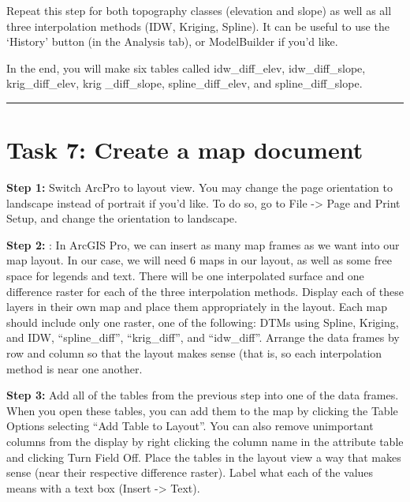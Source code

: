 \documentclass[
]{book}
\begin{document}
Repeat this step for both topography classes (elevation and slope) as well as all three interpolation methods (IDW, Kriging, Spline). It can be useful to use the `History' button (in the Analysis tab), or ModelBuilder if you'd like.

In the end, you will make six tables called idw\_diff\_elev, idw\_diff\_slope, krig\_diff\_elev, krig \_diff\_slope, spline\_diff\_elev, and spline\_diff\_slope.

\begin{center}\rule{0.5\linewidth}{0.5pt}\end{center}

\hypertarget{task-7-create-a-map-document}{%
\section*{Task 7: Create a map document}\label{task-7-create-a-map-document}}

\textbf{Step 1:} Switch ArcPro to layout view. You may change the page orientation to landscape instead of portrait if you'd like. To do so, go to File -\textgreater{} Page and Print Setup, and change the orientation to landscape.

\textbf{Step 2:} : In ArcGIS Pro, we can insert as many map frames as we want into our map layout. In our case, we will need 6 maps in our layout, as well as some free space for legends and text. There will be one interpolated surface and one difference raster for each of the three interpolation methods. Display each of these layers in their own map and place them appropriately in the layout. Each map should include only one raster, one of the following: DTMs using Spline, Kriging, and IDW, ``spline\_diff'', ``krig\_diff'', and ``idw\_diff''. Arrange the data frames by row and column so that the layout makes sense (that is, so each interpolation method is near one another.

\textbf{Step 3:} Add all of the tables from the previous step into one of the data frames. When you open these tables, you can add them to the map by clicking the Table Options selecting ``Add Table to Layout''. You can also remove unimportant columns from the display by right clicking the column name in the attribute table and clicking Turn Field Off. Place the tables in the layout view a way that makes sense (near their respective difference raster). Label what each of the values means with a text box (Insert -\textgreater{} Text).
\end{document}
